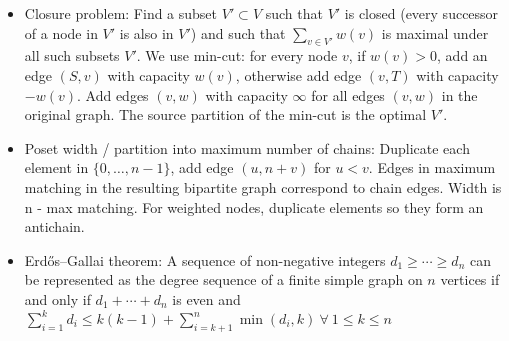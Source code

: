 \documentclass[landscape,a4paper,twocolumn,10pt]{report}
\begin{document}
\begin{itemize}
\item Closure problem: Find a subset $V' \subset V$ such that $V'$ is closed (every successor of a node in $V'$ is also in $V'$) and such that $\sum_{v \in V'} w(v)$ is maximal under all such subsets $V'$. We use min-cut: for every node $v$, if $w(v) > 0$, add an edge $(S, v)$ with capacity $w(v)$, otherwise add edge $(v,T)$ with capacity $-w(v)$. Add edges $(v,w)$ with capacity $\infty$ for all edges $(v,w)$ in the original graph. The source partition of the min-cut is the optimal $V'$.
\item Poset width / partition into maximum number of chains: Duplicate each element
in $\{0,\ldots,n-1\}$, add edge $(u, n+v)$ for $u < v$. Edges in maximum matching in the
resulting bipartite graph correspond to chain edges. Width is n - max matching.
For weighted nodes, duplicate elements so they form an antichain.
\item Erdős–Gallai theorem: A sequence of non-negative integers $d_1\geq\cdots\geq d_n$ can be represented as the degree sequence of a finite simple graph on $n$ vertices if and only if $d_1+\cdots+d_n$ is even and $\sum^{k}_{i=1}d_i\leq k(k-1)+ \sum^n_{i=k+1} \min(d_i,k) \ \forall\ 1 \leq k \leq n$

\end{itemize}
\end{document}
